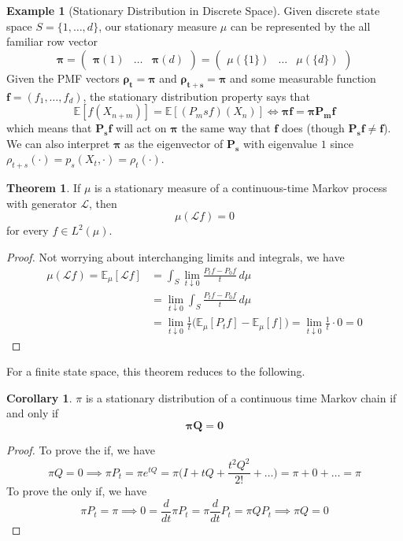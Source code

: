 \documentclass{article}
\theoremstyle{definition}
\newtheorem{theorem}{Theorem}[section]
\newtheorem{example}{Example}[section]
\newtheorem{corollary}{Corollary}[theorem]
\theoremstyle{remark}
\theoremstyle{definition}
\begin{document}
\begin{example}[Stationary Distribution in Discrete Space]
Given discrete state space $S = \{1, \ldots, d\}$, our stationary measure $\mu$ can be represented by the all familiar row vector 
\[\boldsymbol{\pi} = \begin{pmatrix} \boldsymbol{\pi} (1) & \ldots & \boldsymbol{\pi} (d) \end{pmatrix} = \begin{pmatrix} \mu(\{1\}) & \ldots & \mu(\{d\}) \end{pmatrix}\] 
Given the PMF vectors $\boldsymbol{\rho_t} = \boldsymbol{\pi}$ and $\boldsymbol{\rho_{t + s}} = \boldsymbol{\pi}$ and some measurable function $\mathbf{f} = (f_1, \ldots, f_d)$, the stationary distribution property says that 
\[\mathbb{E}[f(X_{n + m})] = \mathbb{E}[(P_ms f)(X_n)] \iff \boldsymbol{\pi} \mathbf{f} = \boldsymbol{\pi} \mathbf{P_m} \mathbf{f}\]
which means that $\mathbf{P_s} \mathbf{f}$ will act on $\boldsymbol{\pi}$ the same way that $\mathbf{f}$ does (though $\mathbf{P_s} \mathbf{f} \neq \mathbf{f}$). We can also interpret $\boldsymbol{\pi}$ as the eigenvector of $\mathbf{P_s}$ with eigenvalue $1$ since $\rho_{t + s} (\cdot) = p_s (X_t, \cdot) = \rho_t(\cdot)$. 
\end{example}

\begin{theorem}
If $\mu$ is a stationary measure of a continuous-time Markov process with generator $\mathscr{L}$, then 
\[\mu(\mathscr{L} f) = 0\]
for every $f \in L^2 (\mu)$. 
\end{theorem}
\begin{proof}
Not worrying about interchanging limits and integrals, we have 
\begin{align*}
    \mu(\mathscr{L} f) = \mathbb{E}_\mu [\mathscr{L} f] & = \int_S \lim_{t \downarrow 0} \frac{P_t f - P_0 f}{t} \,d\mu \\ 
    & = \lim_{t \downarrow 0} \int_S \frac{P_t f - P_0 f}{t} \,d\mu \\
    & = \lim_{t \downarrow 0} \frac{1}{t} \big( \mathbb{E}_\mu [P_t f] - \mathbb{E}_\mu [f] \big) = \lim_{t \downarrow 0} \frac{1}{t} \cdot 0 = 0 
\end{align*}
\end{proof}

For a finite state space, this theorem reduces to the following. 

\begin{corollary}
$\pi$ is a stationary distribution of a continuous time Markov chain if and only if 
\[\boldsymbol{\pi} \mathbf{Q} = \mathbf{0}\]
\end{corollary}
\begin{proof}
To prove the if, we have 
\[\pi Q = 0 \implies \pi P_t= \pi e^{t Q} = \pi \bigg(I + t Q + \frac{t^2 Q^2}{2!} + \ldots \bigg) = \pi + 0 + \ldots = \pi\]
To prove the only if, we have 
\[\pi P_t = \pi \implies 0 = \frac{d}{dt} \pi P_t = \pi \frac{d}{dt} P_t = \pi Q P_t \implies \pi Q = 0\]
\end{proof}
\end{document}
